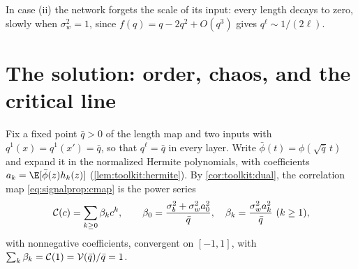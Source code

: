 \begin{refsection}
In case (ii) the network forgets the scale of its input: every length decays to zero, slowly when $\sigma_w^2=1$, since $f(q)=q-2q^2+O(q^3)$ gives $q^\ell\sim1/(2\ell)$.

\section{The solution: order, chaos, and the critical line}\label{sec:signalprop:phase}

Fix a fixed point $\bar q>0$ of the length map and two inputs with $q^1(x)=q^1(x')=\bar q$, so that $q^\ell=\bar q$ in every layer. Write $\bar\phi(t)=\phi(\sqrt{\bar q}\,t)$ and expand it in the normalized Hermite polynomials, with coefficients $a_k=\E[\bar\phi(z)h_k(z)]$ (\cref{lem:toolkit:hermite}). By \cref{cor:toolkit:dual}, the correlation map \eqref{eq:signalprop:cmap} is the power series
\begin{equation}\label{eq:signalprop:series}
  \mathcal{C}(c)=\sum_{k\ge0}\beta_kc^k,\qquad \beta_0=\frac{\sigma_b^2+\sigma_w^2a_0^2}{\bar q},\quad \beta_k=\frac{\sigma_w^2a_k^2}{\bar q}\ (k\ge1),
\end{equation}
with nonnegative coefficients, convergent on $[-1,1]$, with $\sum_k\beta_k=\mathcal{C}(1)=\mathcal{V}(\bar q)/\bar q=1$.


\end{refsection}
